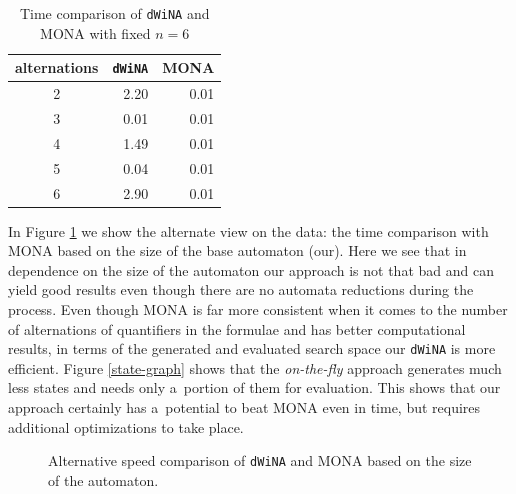 \begin{table}
\begin{center}
 \begin{tabular}{|c|r|r|}
  \hline
  \textbf{alternations} & \texttt{dWiNA} & \textsc{MONA}\\
  \hline
  \hline
  2 & 2.20 & 0.01\\
  \hline
  3 & 0.01 & 0.01\\
  \hline
  4 & 1.49 & 0.01\\
  \hline
  5 & 0.04 & 0.01\\
  \hline
  6 & 2.90 & 0.01\\
  \hline
 \end{tabular}
 \end{center}
 \caption{Time comparison of \texttt{dWiNA} and \textsc{MONA} with fixed $n =
 6$}
\end{table}
\newpage
In Figure \ref{size-n} we show the alternate view on the data: the time
comparison with \textsc{MONA} based on the size of the base automaton (our).
Here we see that in dependence on the size of the automaton our approach is not
that bad and can yield good results even though there are no automata reductions during the
process. Even though \textsc{MONA} is far more consistent when it comes to the number of
alternations of quantifiers in the formulae and has better computational
results, in terms of the generated and evaluated search space our \texttt{dWiNA}
is more efficient. Figure \ref{state-graph} shows that the \emph{on-the-fly}
approach generates much less states and needs only a~portion of them for evaluation. This
shows that our approach certainly has a~potential to beat \textsc{MONA} even in
time, but requires additional optimizations to take place.

\begin{figure}[h!]
 \begin{center}
 \end{center}
 \caption{Alternative speed comparison of \texttt{dWiNA} and \textsc{MONA}
 based on the size of the automaton.}\label{size-n}
\end{figure}

